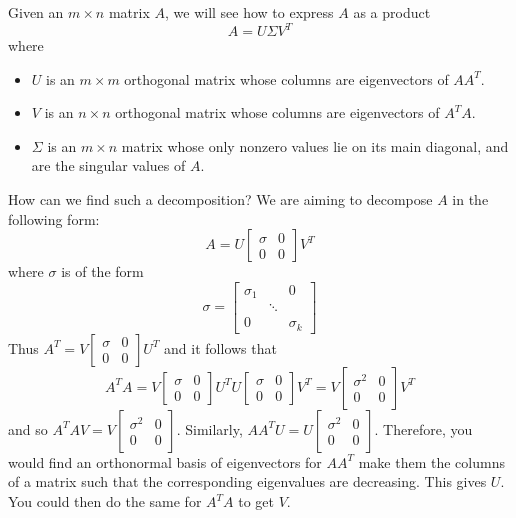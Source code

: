 \documentclass{ximera}
\begin{document}
Given an $m\times n$ matrix $A$, we will see how to express $A$ as a product
\[ A=U\Sigma V^T\]
where
\begin{itemize}
\item $U$ is an $m\times m$ orthogonal matrix whose columns are
eigenvectors of $AA^T$.
\item $V$ is an $n\times n$ orthogonal matrix whose columns are
eigenvectors of $A^TA$.
\item $\Sigma$ is an $m\times n$ matrix whose only nonzero values
lie on its main diagonal, and are the singular values of $A$.
\end{itemize}
How can we find such a decomposition? We are aiming to decompose $A$ in the following form:
\begin{equation*}
A=U\left[
\begin{array}{cc}
\sigma & 0 \\
0 & 0
\end{array}
\right] V^T
\end{equation*}
where $\sigma $ is of the form
\[
\sigma =\left[
\begin{array}{ccc}
\sigma _{1} &  & 0 \\
& \ddots &  \\
0 &  & \sigma _{k}
\end{array}
\right]
\]
Thus $A^T=V\left[
\begin{array}{cc}
\sigma & 0 \\
0 & 0
\end{array}
\right] U^T$ and it follows that
\begin{equation*}
A^TA=V\left[
\begin{array}{cc}
\sigma & 0 \\
0 & 0
\end{array}
\right] U^TU\left[
\begin{array}{cc}
\sigma & 0 \\
0 & 0
\end{array}
\right] V^T=V\left[
\begin{array}{cc}
\sigma ^{2} & 0 \\
0 & 0
\end{array}
\right] V^T
\end{equation*}
and so $A^TAV=V\left[
\begin{array}{cc}
\sigma ^{2} & 0 \\
0 & 0
\end{array}
\right] .$ Similarly, $AA^TU=U\left[
\begin{array}{cc}
\sigma ^{2} & 0 \\
0 & 0
\end{array}
\right] .$ Therefore, you would find an orthonormal basis of eigenvectors
for $AA^T$ make them the columns of a matrix such that the
corresponding eigenvalues are decreasing. This gives $U.$ You could then do
the same for $A^TA$ to get $V$.
\end{document}
